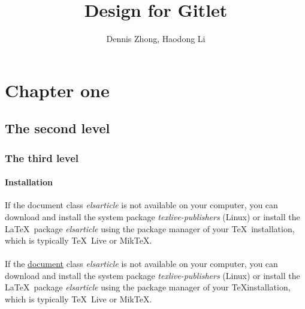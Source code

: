 \documentclass[10pt]{article}
\author{Dennis Zhong, Haodong Li}
\title{\LARGE\textbf{Design for Gitlet}}
\begin{document}
\maketitle

\section{Chapter one} %
\subsection{The second level} %
\subsubsection{The third level} %
\paragraph{Installation} If the document class \emph{elsarticle} is not available on your computer, you can download and install the system package \emph{texlive-publishers} (Linux) or install the \LaTeX\ package \emph{elsarticle} using the package manager of your \TeX\ installation, which is typically \TeX\ Live or Mik\TeX.

\paragraph{} If the \underline{document} class \emph{elsarticle} is not available on your computer, you can download and install the system package \emph{texlive-publishers} (Linux) or install the \LaTeX\ package \emph{elsarticle} using the package manager of your \TeX installation, which is typically \TeX\ Live or Mik\TeX.
\end{document}
